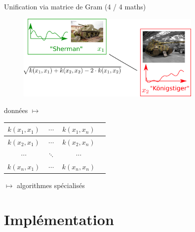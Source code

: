 \documentclass{beamer}
\begin{document}
\begin{frame}{Unification via matrice de Gram (4 / 4 maths)}
	\begin{figure}[t]
		\includegraphics[width=0.8\textwidth]{figures/distance}
	\end{figure}
	
	\begin{table}
		données $\mapsto$
		\begin{tabular}{ |c|c|c|c| }
			\hline
			$k(x_1, x_1)$ & $\cdots$  & $k(x_1, x_n)$ \\
			\hline
			$k(x_2, x_1)$ & $\cdots$ & $k(x_2, x_n)$ \\
			\hline
			$\cdots$ & $\ddots$ & $\cdots$ \\
			\hline
			$k(x_n, x_1)$ & $\cdots$ & $k(x_n, x_n)$ \\
			\hline
		\end{tabular}
	$\mapsto$ algorithmes spécialisés
	\end{table}
\end{frame}

\section{Implémentation}
\end{document}
